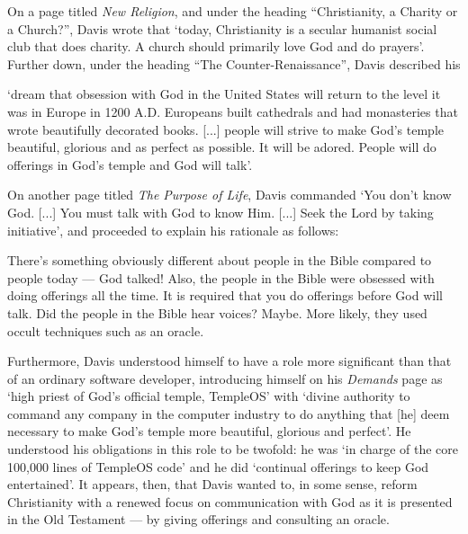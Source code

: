 \documentclass[Draft.tex]{subfiles}
\begin{document}
On a page titled \textit{New Religion}, and under the heading
``Christianity, a Charity or a Church?'', Davis \parencite*{NewReligion}
wrote that `today, Christianity is a secular humanist social club
that does charity.  A church should primarily love God and do prayers'.
Further down, under the heading ``The Counter-Renaissance'',
Davis described his
\begin{displayquote}
	`dream that obsession with God in the United States
	will return to the level it was in Europe in 1200 A.D.
	Europeans built cathedrals and had monasteries
	that wrote beautifully decorated books. [...]
	people will strive to make God's temple beautiful, glorious
	and as perfect as possible.  It will be adored.
	People will do offerings in God's temple and God will talk'.
\end{displayquote}
On another page titled \textit{The Purpose of Life},
Davis \parencite*{PurposeLife} commanded `You don't know God. [...]
You must talk with God to know Him. [...] Seek the Lord by taking initiative',
and proceeded to explain his rationale as follows:
\begin{displayquote}
	There's something obviously different about people in the Bible
	compared to people today --- God talked!
	Also, the people in the Bible were obsessed with doing offerings all the time.
	It is required that you do offerings before God will talk.
	Did the people in the Bible hear voices?  Maybe.
	More likely, they used occult techniques such as an oracle.
\end{displayquote}
Furthermore, Davis \parencite*{Demands} understood himself to have a role
more significant than that of an ordinary software developer,
introducing himself on his \textit{Demands} page as
`high priest of God's official temple, TempleOS' with
`divine authority to command any company in the computer industry
to do anything that [he] deem necessary to make God's temple
more beautiful, glorious and perfect'.
He understood his obligations in this role to be twofold: he was
`in charge of the core 100,000 lines of TempleOS code'
and he did `continual offerings to keep God entertained'.
It appears, then, that Davis wanted to, in some sense, reform Christianity
with a renewed focus on communication with God
as it is presented in the Old Testament ---
by giving offerings and consulting an oracle.
\end{document}
